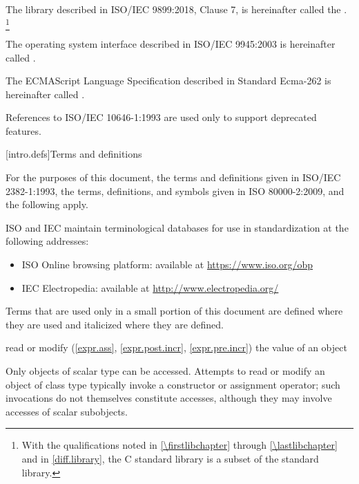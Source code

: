 \pnum
The library described in ISO/IEC 9899:2018, Clause 7,
is hereinafter called the
.%
\footnote{With the qualifications noted in \ref{\firstlibchapter}
through \ref{\lastlibchapter} and in \ref{diff.library}, the C standard
library is a subset of the \Cpp{} standard library.}

\pnum
The operating system interface described in ISO/IEC 9945:2003 is
hereinafter called .

\pnum
The ECMAScript Language Specification described in Standard Ecma-262 is
hereinafter called .

\pnum
\begin{note}
References to ISO/IEC 10646-1:1993 are used only
to support deprecated features.
\end{note}

[intro.defs]{Terms and definitions}

\pnum
{}%
For the purposes of this document,
the terms and definitions
given in ISO/IEC 2382-1:1993,
the terms, definitions, and symbols
given in ISO 80000-2:2009,
and the following apply.

\pnum
ISO and IEC maintain terminological databases
for use in standardization
at the following addresses:
\begin{itemize}
\item ISO Online browsing platform: available at \url{https://www.iso.org/obp}
\item IEC Electropedia: available at \url{http://www.electropedia.org/}
\end{itemize}

\pnum
Terms that are used only in a small portion of this document
are defined where they are used and italicized where they are
defined.

%
read or
modify (\ref{expr.ass}, \ref{expr.post.incr}, \ref{expr.pre.incr})
the value of an object

\begin{defnote}
Only objects of scalar type can be accessed.
Attempts to read or modify an object of class type
typically invoke a constructor
or assignment operator;
such invocations do not themselves constitute accesses,
although they may involve accesses of scalar subobjects.
\end{defnote}

